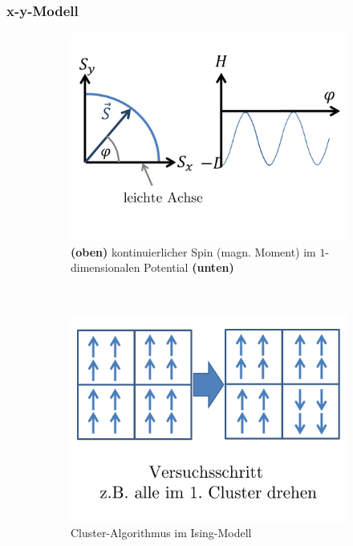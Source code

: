 \documentclass[12pt]{article}
\begin{document}
\subsubsection{x-y-Modell}
\begin{figure}[h] 
		\begin{subfigure}[h]{0.5 \textwidth}
		\centering
		\includegraphics[width=\textwidth]{Folie45.png}
		\caption{\textbf{(oben)} kontinuierlicher Spin (magn. Moment)   im $1$-dimensionalen Potential \textbf{(unten)}} 
		\label{fig:Spin_Potential}
		\centering
	\end{subfigure}
	~
\begin{subfigure}[h]{0.5\textwidth}
		\centering
		\includegraphics[width=\textwidth]{Folie46.png}
		\caption{Cluster-Algorithmus im Ising-Modell}
		\label{fig:Cluster_Ising}
		\centering
	\end{subfigure}
	\caption{} %
\end{figure}	
\end{document}
